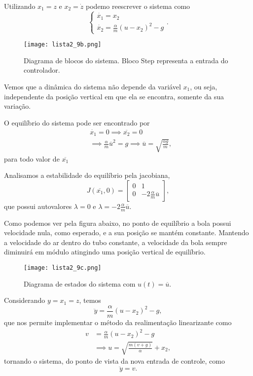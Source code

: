 \documentclass[a4paper]{report}
\begin{document}

Utilizando $x_1 = z$ e $x_2=\dot{z}$ podemo reescrever o sistema como \[
\begin{cases}
    \dot{x_1} = x_2 \\
    \dot{x_2} = \frac{\alpha}{m}\left( u-x_2 \right) ^2 - g
\end{cases}
.\]

\begin{figure}[H]
    \centering
    \texttt{[image: lista2\_9b.png]}
    \caption{Diagrama de blocos do sistema. Bloco Step representa a entrada do controlador.}
    \label{fig:lista2_9b-png}
\end{figure}

Vemos que a dinâmica do sistema não depende da variável $x_1$, ou seja, independente da posição vertical em que ela se encontra, somente da sua variação.

O equilíbrio do sistema pode ser encontrado por
\begin{align*}
    &\dot{x_1} = 0 \implies \overline{x_2} = 0 \\
    &\implies \frac{\alpha}{m}\overline{u}^2 = g \implies \overline{u} = \sqrt{\frac{\alpha g}{m}} 
,\end{align*}
para todo valor de $\overline{x_1}$

Analisamos a estabilidade do equilíbrio pela jacobiana, \[
    J(\overline{x_1},0) = \begin{bmatrix} 
    0 & 1 \\
    0 & -2 \frac{\alpha}{m}\overline{u}
\end{bmatrix} 
,\] que possui autovalores $\lambda = 0$ e $\lambda = -2 \frac{\alpha}{m}\overline{u}$.

Como podemos ver pela figura abaixo, no ponto de equilíbrio a bola possui velocidade nula, como esperado, e a sua posição se mantém constante. Mantendo a velocidade do ar dentro do tubo constante, a velocidade da bola sempre diminuirá em módulo atingindo uma posição vertical de equilíbrio.

\begin{figure}[H]
    \centering
    \texttt{[image: lista2\_9c.png]}
    \caption{Diagrama de estados do sistema com $u(t) = \overline{u}$.}
    \label{fig:lista2_9c-png}
\end{figure}



Considerando $y=x_1=z$, temos \[
\ddot{y} = \frac{\alpha}{m}\left( u -x_2 \right)^2 -g
,\] que nos permite implementar o método da realimentação linearizante como
\begin{align*}
    v &= \frac{\alpha}{m}\left( u -x_2 \right)^2 -g \\
      &\implies u = \sqrt{\frac{m\left( v +g \right) }{\alpha}} + x_2
,\end{align*}
tornando o sistema, do ponto de vista da nova entrada de controle, como \[
\ddot{y} = v
.\] 
\end{document}
